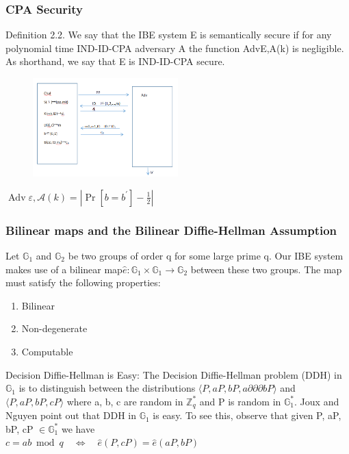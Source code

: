 \documentclass{beamer}
\begin{document}

\begin{frame}
\frametitle{CPA Security}
Definition 2.2. We say that the IBE system E is semantically secure if for any polynomial time IND-ID-CPA adversary A the function AdvE,A(k) is negligible. As shorthand, we say that E is IND-ID-CPA secure.
\begin{figure}[H]
		\centering %
		\includegraphics[width=0.5\textwidth]{./figure/CPA} %
		
		\label{e1} %

\end{figure}
\centering
$\operatorname{Adv} \varepsilon, \mathcal{A}(k)=\left|\operatorname{Pr}\left[b=b^{\prime}\right]-\frac{1}{2}\right|$
\end{frame}


\begin{frame}
\frametitle{Bilinear maps and the Bilinear Diffie-Hellman
Assumption}
Let $ \mathbb{G}_{1}$ and $ \mathbb{G}_{2}$  be two groups of order q for some large prime q. Our IBE system makes use of a bilinear
map$\hat{e}: \mathbb{G}_{1} \times \mathbb{G}_{1} \rightarrow \mathbb{G}_{2}$ between these two groups. The map must satisfy the following properties:\\
\begin{enumerate}
\item Bilinear
\item Non-degenerate
\item Computable
\end{enumerate}
Decision Diffie-Hellman is Easy: The Decision Diffie-Hellman problem (DDH)  in $\mathbb{G}_{1} $ is to distinguish between the distributions $\langle P, a P, b P, a ∂∂∂b P\rangle$ and $\langle P, a P, b P, c P\rangle$ where a, b, c are random in $\mathbb{Z}_{q}^{*}$ and P is random in $\mathbb{G}_{1}^{*}$. Joux and Nguyen  point out that DDH in $\mathbb{G}_{1} $ is easy. To see this, observe that given P, aP, bP, cP $\in \mathbb{G}_{1}^{*}$ we have\\
\centering $c=a b \bmod q \quad \Longleftrightarrow \quad \hat{e}(P, c P)=\hat{e}(a P, b P)$
\end{frame}
\end{document}
